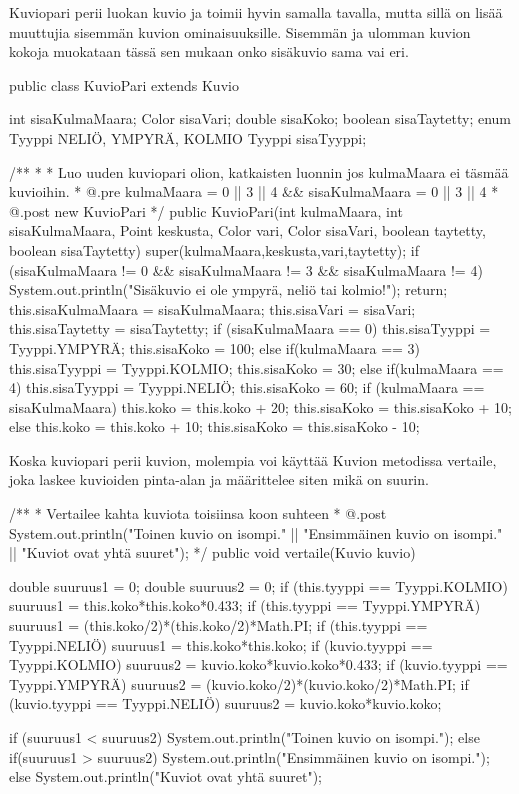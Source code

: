Kuviopari perii luokan kuvio ja toimii hyvin samalla tavalla, mutta sillä on lisää
muuttujia sisemmän kuvion ominaisuuksille. Sisemmän ja ulomman kuvion kokoja muokataan
tässä sen mukaan onko sisäkuvio sama vai eri.
\begin{javacode}
public class KuvioPari extends Kuvio{
  int sisaKulmaMaara;
  Color sisaVari;
  double sisaKoko;
  boolean sisaTaytetty;
  enum Tyyppi{
    NELIÖ, YMPYRÄ, KOLMIO
  }
  Tyyppi sisaTyyppi;
  
  /**
   * 
   * Luo uuden kuviopari olion, katkaisten luonnin jos kulmaMaara ei täsmää kuvioihin.
   * @.pre kulmaMaara = 0 || 3 || 4 && sisaKulmaMaara = 0 || 3 || 4
   * @.post new KuvioPari
   */
  public KuvioPari(int kulmaMaara, int sisaKulmaMaara, Point keskusta, Color vari,
  Color sisaVari, boolean taytetty, boolean sisaTaytetty) {
    super(kulmaMaara,keskusta,vari,taytetty);
    if (sisaKulmaMaara != 0 && sisaKulmaMaara != 3 && sisaKulmaMaara != 4) {
      System.out.println("Sisäkuvio ei ole ympyrä, neliö tai kolmio!");
      return;
    }
    this.sisaKulmaMaara = sisaKulmaMaara;
    this.sisaVari = sisaVari;
    this.sisaTaytetty = sisaTaytetty;
    if (sisaKulmaMaara == 0) {
      this.sisaTyyppi = Tyyppi.YMPYRÄ;
      this.sisaKoko = 100;
    }
    else if(kulmaMaara == 3){
      this.sisaTyyppi = Tyyppi.KOLMIO;
      this.sisaKoko = 30;
    }
    else if(kulmaMaara == 4){
      this.sisaTyyppi = Tyyppi.NELIÖ;
      this.sisaKoko = 60;
    }
    if (kulmaMaara == sisaKulmaMaara) {
      this.koko = this.koko + 20;
      this.sisaKoko = this.sisaKoko + 10;
    }else {
      this.koko = this.koko + 10;
      this.sisaKoko = this.sisaKoko - 10;
    }
  }
}
\end{javacode}

Koska kuviopari perii kuvion, molempia voi käyttää Kuvion metodissa vertaile,
joka laskee kuvioiden pinta-alan ja määrittelee siten mikä on suurin.
\begin{javacode}
  /**
   * Vertailee kahta kuviota toisiinsa koon suhteen
   * @.post System.out.println("Toinen kuvio on isompi." || "Ensimmäinen kuvio on
   isompi." || "Kuviot ovat yhtä suuret");
   */
  public void vertaile(Kuvio kuvio) {
    double suuruus1 = 0;
    double suuruus2 = 0;
    if (this.tyyppi == Tyyppi.KOLMIO) {
      suuruus1 = this.koko*this.koko*0.433;
    }
    if (this.tyyppi == Tyyppi.YMPYRÄ) {
      suuruus1 = (this.koko/2)*(this.koko/2)*Math.PI;
    }
    if (this.tyyppi == Tyyppi.NELIÖ) {
      suuruus1 = this.koko*this.koko;
    }
    if (kuvio.tyyppi == Tyyppi.KOLMIO) {
      suuruus2 = kuvio.koko*kuvio.koko*0.433;
    }
    if (kuvio.tyyppi == Tyyppi.YMPYRÄ) {
      suuruus2 = (kuvio.koko/2)*(kuvio.koko/2)*Math.PI;
    }
    if (kuvio.tyyppi == Tyyppi.NELIÖ) {
      suuruus2 = kuvio.koko*kuvio.koko;
    }
    
    if (suuruus1 < suuruus2) {
      System.out.println("Toinen kuvio on isompi.");
    } else if(suuruus1 > suuruus2) {
      System.out.println("Ensimmäinen kuvio on isompi.");
    } else {
      System.out.println("Kuviot ovat yhtä suuret");
    }
  }
  
\end{javacode}

